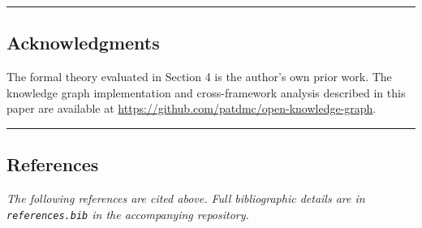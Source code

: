 \documentclass[
]{article}
\begin{document}
\begin{center}\rule{0.5\linewidth}{0.5pt}\end{center}

\subsection{Acknowledgments}\label{acknowledgments}

The formal theory evaluated in Section 4 is the author's own prior work.
The knowledge graph implementation and cross-framework analysis
described in this paper are available at
\url{https://github.com/patdmc/open-knowledge-graph}.

\begin{center}\rule{0.5\linewidth}{0.5pt}\end{center}

\subsection{References}\label{references}




\emph{The following references are cited above. Full bibliographic
details are in \texttt{references.bib} in the accompanying repository.}
\end{document}
